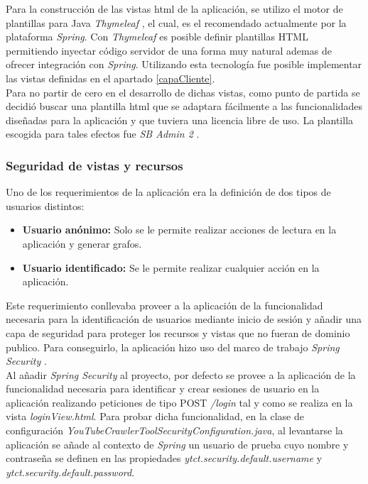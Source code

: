 \documentclass[11pt,a4paper]{article}
\begin{document}
Para la construcción de las vistas html de la aplicación, se utilizo el motor de plantillas para Java \textit{Thymeleaf} \cite{48}, el cual, es el recomendado actualmente por la plataforma \textit{Spring}. Con  \textit{Thymeleaf} es posible definir plantillas HTML permitiendo inyectar código servidor de una forma muy natural ademas de ofrecer integración con \textit{Spring}. Utilizando esta tecnología fue posible implementar las vistas definidas en el apartado \ref{capaCliente}.
\\

Para no partir de cero en el desarrollo de dichas vistas, como punto de partida se decidió buscar una plantilla html que se adaptara fácilmente a las funcionalidades diseñadas para la aplicación y que tuviera una licencia libre de uso. La plantilla escogida para tales efectos fue \textit{SB Admin 2} \cite{49}. 
\medskip 

\subsubsection{Seguridad de vistas y recursos}
Uno de los requerimientos de la aplicación era la definición de dos tipos de usuarios distintos:
\begin{itemize}
\item \textbf{Usuario anónimo:} Solo se le permite realizar acciones de lectura en la aplicación y generar grafos.
\item \textbf{Usuario identificado:} Se le permite realizar cualquier acción en la aplicación.
\end{itemize}

Este requerimiento conllevaba proveer a la aplicación de la funcionalidad necesaria para la identificación de usuarios mediante inicio de sesión y añadir una capa de seguridad para proteger los recursos y vistas que no fueran de dominio publico. Para conseguirlo, la aplicación hizo uso del marco de trabajo \textit{Spring Security} \cite{50}.
\\

Al añadir \textit{Spring Security} al proyecto, por defecto se provee a la aplicación de la funcionalidad necesaria para identificar y crear sesiones de usuario en la aplicación realizando peticiones de tipo POST \textit{/login} tal y como se realiza en la vista \textit{loginView.html}. Para probar dicha funcionalidad, en la clase de configuración \textit{YouTubeCrawlerToolSecurityConfiguration.java}, al levantarse la aplicación se añade al contexto de \textit{Spring} un usuario de prueba cuyo nombre y contraseña se definen en las propiedades \textit{ytct.security.default.username} y \textit{ytct.security.default.password}.
\\
\end{document}
